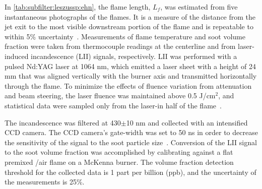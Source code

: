 In \cref{tab:subfilter:leszussp:ehn}, the flame length, $L_f$, was estimated from five instantaneous photographs of the flames. It is a measure of the distance from the jet exit to the most visible downstream portion of the flame and is repeatable to within 5\% uncertainty~\cite{mahmoud2017}. Measurements of flame temperature and soot volume fraction were taken from thermocouple readings at the centerline and from laser-induced incandescence (LII) signals, respectively. LII was performed with a pulsed Nd:YAG laser at 1064 nm, which emitted a laser sheet with a height of 24 mm that was aligned vertically with the burner axis and transmitted horizontally through the flame. To minimize the effects of fluence variation from attenuation and beam steering, the laser fluence was maintained above 0.5 J/cm$^2$, and statistical data were sampled only from the laser-in half of the flame~\cite{mahmoud2017,sun2015}.

The incandescence was filtered at 430$\pm$10 nm and collected with an intensified CCD camera. The CCD camera's gate-width was set to 50 ns in order to decrease the sensitivity of the signal to the soot particle size~\cite{vanderwal1996,mahmoud2017}. Conversion of the LII signal to the soot volume fraction was accomplished by calibrating against a flat premixed /air flame on a McKenna burner. The volume fraction detection threshold for the collected data is 1 part per billion (ppb), and the uncertainty of the measurements is 25\%.

